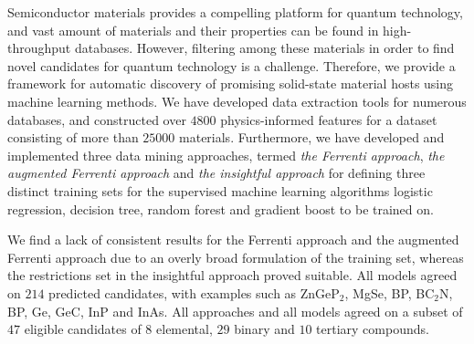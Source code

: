 Semiconductor materials provides a compelling platform for quantum technology, and vast amount of materials and their properties can be found in high-throughput databases.
However, filtering among these materials in order to find novel candidates for quantum technology is a challenge. Therefore, we provide a framework for automatic discovery of promising solid-state material hosts using machine learning methods.
We have developed data extraction tools for numerous databases, and constructed over $4800$ physics-informed features for a dataset consisting of more than $25000$ materials.
Furthermore, we have developed and implemented three data mining approaches, termed \textit{the Ferrenti approach}, \textit{the augmented Ferrenti approach} and \textit{the insightful approach} for defining three distinct training sets for the supervised machine learning algorithms logistic regression, decision tree, random forest and gradient boost to be trained on.

We find a lack of consistent results for the Ferrenti approach and the augmented Ferrenti approach due to an overly broad formulation of the training set, whereas the restrictions set in the insightful approach proved suitable. All models agreed on $214$ predicted candidates, with examples such as ZnGeP$_2$, MgSe, BP, BC$_2$N, BP, Ge, GeC, InP and InAs. All approaches and all models agreed on a subset of $47$ eligible candidates of $8$ elemental, $29$ binary and $10$ tertiary compounds.






